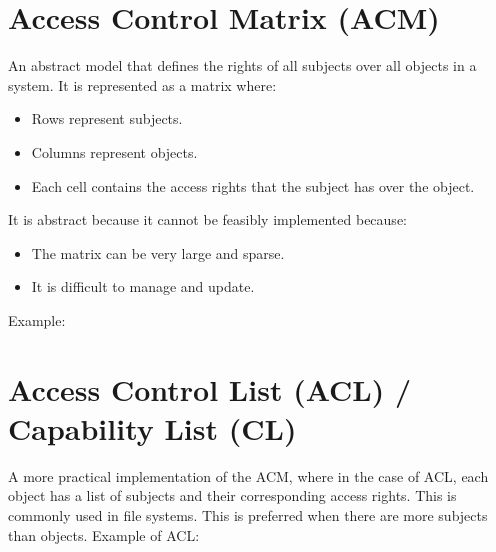 \documentclass[12pt letter]{report}
\begin{document}
\section{Access Control Matrix (ACM)}

An abstract model that defines the rights of all subjects over all
objects in a system. It is represented as a matrix where:
\begin{itemize}
  \item Rows represent subjects.
  \item Columns represent objects.
  \item Each cell contains the access rights that the subject has over
    the object.
\end{itemize}
It is abstract because it cannot be feasibly implemented because:
\begin{itemize}
  \item The matrix can be very large and sparse.
  \item It is difficult to manage and update.
\end{itemize}
Example:
\begin{figure}[H]
  \centering
\end{figure}

\section{Access Control List (ACL) / Capability List (CL)}

A more practical implementation of the ACM, where in the case of ACL,
each object has a list of subjects and their corresponding access
rights. This is commonly used in file systems. This is preferred when
there are more subjects than objects.
Example of ACL:
\begin{figure}[H]
  \centering
\end{figure}
\end{document}
